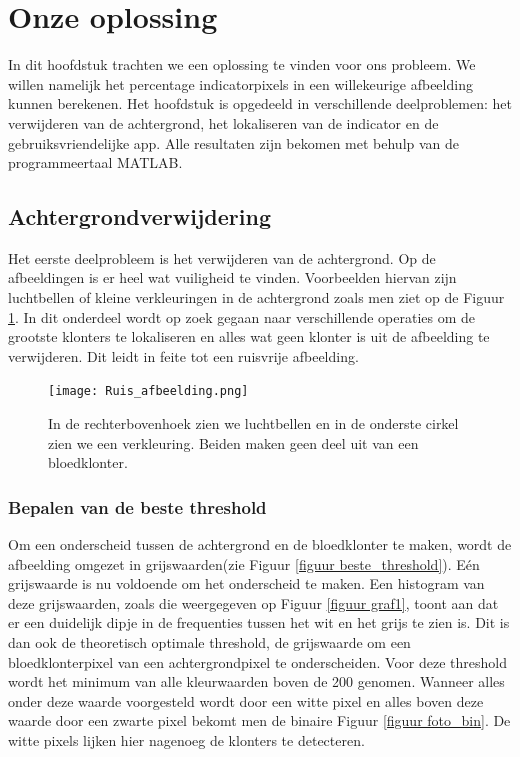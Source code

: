 \documentclass[a4paper,kulak]{kulakarticle}
\begin{document}
\section{Onze oplossing}
In dit hoofdstuk trachten we een oplossing te vinden voor ons probleem. We willen namelijk het percentage indicatorpixels in een willekeurige afbeelding kunnen berekenen. Het hoofdstuk is opgedeeld in verschillende deelproblemen: het verwijderen van de achtergrond, het lokaliseren van de indicator en de gebruiksvriendelijke app. Alle resultaten zijn bekomen met behulp van de programmeertaal MATLAB.\cite{matlab}

\subsection{Achtergrondverwijdering} \label{Achtergrondverwijdering}
Het eerste deelprobleem is het verwijderen van de achtergrond. Op de afbeeldingen is er heel wat vuiligheid te vinden. Voorbeelden hiervan zijn luchtbellen of kleine verkleuringen in de achtergrond zoals men ziet op de Figuur \ref{figuur achtergrondverwijdering}. In dit onderdeel wordt op zoek gegaan naar verschillende operaties om de grootste klonters te lokaliseren en alles wat geen klonter is uit de afbeelding te verwijderen. Dit leidt in feite tot een ruisvrije afbeelding.

\begin{figure}[H]
	\centering
	\texttt{[image: Ruis\_afbeelding.png]}	
	\caption{In de rechterbovenhoek zien we luchtbellen en in de onderste cirkel zien we een verkleuring. Beiden maken geen deel uit van een bloedklonter.}
	\label{figuur achtergrondverwijdering}
\end{figure}

\subsubsection{Bepalen van de beste threshold}
Om een onderscheid tussen de achtergrond en de bloedklonter te maken, wordt de afbeelding omgezet in grijswaarden(zie Figuur \ref{figuur beste_threshold}). Eén grijswaarde is nu voldoende om het onderscheid te maken. Een histogram van deze grijswaarden, zoals die weergegeven op Figuur \ref{figuur graf1}, toont aan dat er een duidelijk dipje in de frequenties tussen het wit en het grijs te zien is. Dit is dan ook de theoretisch optimale threshold, de grijswaarde om een bloedklonterpixel van een achtergrondpixel te onderscheiden. Voor deze threshold wordt het minimum van alle kleurwaarden boven de 200 genomen. Wanneer alles onder deze waarde voorgesteld wordt door een witte pixel en alles boven deze waarde door een zwarte pixel bekomt men de binaire Figuur \ref{figuur foto_bin}. De witte pixels lijken hier nagenoeg de klonters te detecteren.
\end{document}
